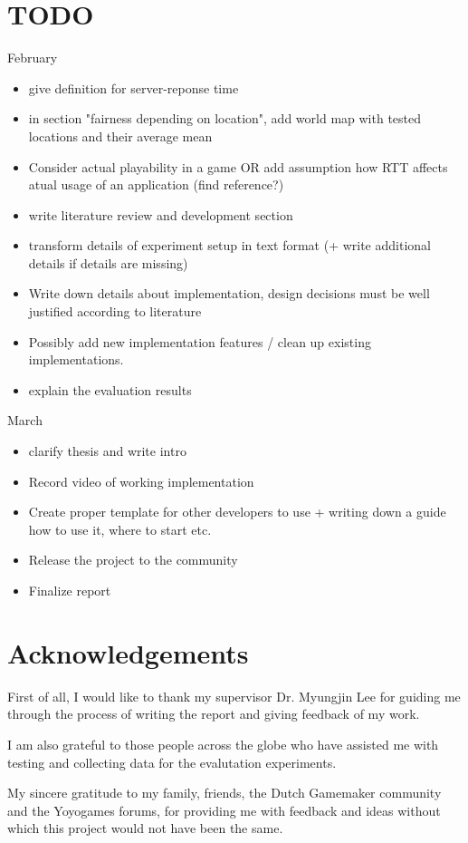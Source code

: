 \documentclass[bsc,frontabs,twoside,singlespacing,parskip,deptreport]{infthesis}     %
\begin{document}
\section*{TODO}
February
\begin{itemize}
\item give definition for server-reponse time
\item in section "fairness depending on location", add world map with tested locations and their average mean
\item Consider actual playability in a game OR add assumption how RTT affects atual usage of an application (find reference?)
\item write literature review and development section
\item transform details of experiment setup in text format (+ write additional details if details are missing)
\item Write down details about implementation, design decisions must be well justified according to literature
\item Possibly add new implementation features / clean up existing implementations.
\item explain the evaluation results
\end{itemize}
March
\begin{itemize}
\item clarify thesis and write intro
\item Record video of working implementation
\item Create proper template for other developers to use + writing down a guide how to use it, where to start etc.
\item Release the project to the community
\item Finalize report
\end{itemize}

\pagebreak
\section*{Acknowledgements}
First of all, I would like to thank my supervisor Dr. Myungjin Lee for guiding me through the process of writing the report and giving feedback of my work.

I am also grateful to those people across the globe who have assisted me with testing and collecting data for the evalutation experiments.

My sincere gratitude to my family, friends, the Dutch Gamemaker community and the Yoyogames forums, for providing me with feedback and ideas without which this project would not have been the same.
\end{document}
